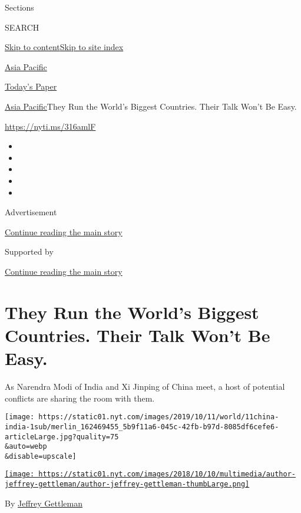 Sections

SEARCH

\protect\hyperlink{site-content}{Skip to
content}\protect\hyperlink{site-index}{Skip to site index}

\href{https://www.nytimes.com/section/world/asia}{Asia Pacific}

\href{https://myaccount.nytimes.com/auth/login?response_type=cookie\&client_id=vi}{}

\href{https://www.nytimes.com/section/todayspaper}{Today's Paper}

\href{/section/world/asia}{Asia Pacific}\textbar{}They Run the World's
Biggest Countries. Their Talk Won't Be Easy.

\url{https://nyti.ms/316amlF}

\begin{itemize}
\item
\item
\item
\item
\item
\end{itemize}

Advertisement

\protect\hyperlink{after-top}{Continue reading the main story}

Supported by

\protect\hyperlink{after-sponsor}{Continue reading the main story}

\hypertarget{they-run-the-worlds-biggest-countries-their-talk-wont-be-easy}{%
\section{They Run the World's Biggest Countries. Their Talk Won't Be
Easy.}\label{they-run-the-worlds-biggest-countries-their-talk-wont-be-easy}}

As Narendra Modi of India and Xi Jinping of China meet, a host of
potential conflicts are sharing the room with them.

\texttt{[image: https://static01.nyt.com/images/2019/10/11/world/11china-india-1sub/merlin\_162469455\_5b9f11a6-045c-42fb-b97d-8085df6cefe6-articleLarge.jpg?quality=75\\\&auto=webp\\\&disable=upscale]}

\href{https://www.nytimes.com/by/jeffrey-gettleman}{\texttt{[image: https://static01.nyt.com/images/2018/10/10/multimedia/author-jeffrey-gettleman/author-jeffrey-gettleman-thumbLarge.png]}}

By \href{https://www.nytimes.com/by/jeffrey-gettleman}{Jeffrey
Gettleman}

